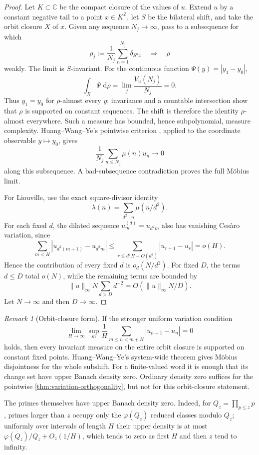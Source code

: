 \documentclass[11pt]{article}
\theoremstyle{definition}
\theoremstyle{remark}
\newtheorem{remark}[theorem]{Remark}
\newcommand{\dd}{\,\mathrm d}
\begin{document}
\begin{proof}
Let $K\subset\mathbb C$ be the compact closure of the values of $u$.  Extend $u$ by a
constant negative tail to a point $x\in K^{\mathbb Z}$, let $S$ be the bilateral shift,
and take the orbit closure $X$ of $x$.  Given any sequence $N_j\to\infty$, pass to a
subsequence for which
\[
 \rho_j:=\frac1{N_j}\sum_{n=1}^{N_j}\delta_{S^nx}
 \quad\Longrightarrow\quad \rho
\]
weakly.  The limit is $S$-invariant.  For the continuous function
$\Psi(y)=|y_1-y_0|$,
\[
 \int_X\Psi\,\dd\rho
 =\lim_j\frac{V_u(N_j)}{N_j}=0.
\]
Thus $y_1=y_0$ for $\rho$-almost every $y$; invariance and a countable intersection
show that $\rho$ is supported on constant sequences.  The shift is therefore the identity
$\rho$-almost everywhere.  Such a measure has bounded, hence subpolynomial, measure
complexity.  Huang--Wang--Ye's pointwise criterion
\cite[Theorem~1.1$'$]{HWY}, applied to the coordinate observable $y\mapsto y_0$, gives
\[
 \frac1{N_j}\sum_{n\le N_j}\mu(n)u_n\longrightarrow0
\]
along this subsequence.  A bad-subsequence contradiction proves the full M\"obius limit.

For Liouville, use the exact square-divisor identity
\[
 \lambda(n)=\sum_{d^2\mid n}\mu(n/d^2).
\]
For each fixed $d$, the dilated sequence $u^{(d)}_m=u_{d^2m}$ also has vanishing
Ces\`aro variation, since
\[
 \sum_{m<H}|u_{d^2(m+1)}-u_{d^2m}|
 \le\sum_{r\le d^2H+O(d^2)}|u_{r+1}-u_r|=o(H).
\]
Hence the contribution of every fixed $d$ is $o_d(N/d^2)$.  For fixed $D$, the terms
$d\le D$ total $o(N)$, while the remaining terms are bounded by
\[
 \|u\|_\infty N\sum_{d>D}d^{-2}=O(\|u\|_\infty N/D).
\]
Let $N\to\infty$ and then $D\to\infty$.
\end{proof}

\begin{remark}[Orbit-closure form]\label{rem:upper-Banach}
If the stronger uniform variation condition
\[
 \lim_{H\to\infty}\sup_m\frac1H
 \sum_{m\le n<m+H}|u_{n+1}-u_n|=0
\]
holds, then every invariant measure on the entire orbit closure is supported on constant
fixed points.  Huang--Wang--Ye's system-wide theorem \cite[Theorem~1.2]{HWY} gives
M\"obius disjointness for the whole subshift.  For a finite-valued word it is enough that
its change set have upper Banach density zero.  Ordinary density zero suffices for the
pointwise \cref{thm:variation-orthogonality}, but not for this orbit-closure statement.
\end{remark}

The primes themselves have upper Banach density zero.  Indeed, for
$Q_z=\prod_{p\le z}p$, primes larger than $z$ occupy only the $\varphi(Q_z)$ reduced
classes modulo $Q_z$; uniformly over intervals of length $H$ their upper density is at
most $\varphi(Q_z)/Q_z+O_z(1/H)$, which tends to zero as first $H$ and then $z$ tend to
infinity.
\end{document}
